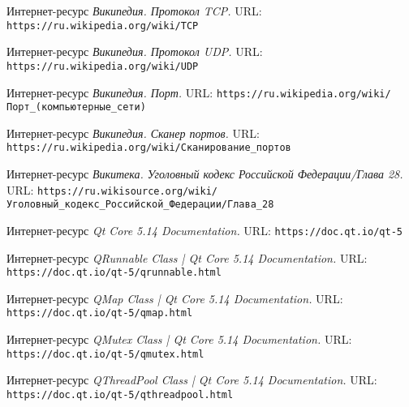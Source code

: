  
\clearpage

\begin{thebibliography}{3}
Интернет-ресурс \textit{Википедия. Протокол TCP.} URL: \texttt{https://ru.wikipedia.org/wiki/TCP}

Интернет-ресурс \textit{Википедия. Протокол UDP.} URL: \texttt{https://ru.wikipedia.org/wiki/UDP}

Интернет-ресурс \textit{Википедия. Порт.} URL: \texttt{https://ru.wikipedia.org/wiki/Порт\_(компьютерные\_сети)}

Интернет-ресурс \textit{Википедия. Сканер портов.} URL: \texttt{https://ru.wikipedia.org/wiki/Сканирование\_портов}

Интернет-ресурс \textit{Викитека. Уголовный кодекс Российской Федерации/Глава 28.} URL: \texttt{https://ru.wikisource.org/wiki/Уголовный\_кодекс\_Российской\_Федерации/Глава\_28}

Интернет-ресурс \textit{Qt Core 5.14 Documentation.} URL: \texttt{https://doc.qt.io/qt-5}

Интернет-ресурс \textit{QRunnable Class | Qt Core 5.14 Documentation.} URL: \texttt{https://doc.qt.io/qt-5/qrunnable.html}

Интернет-ресурс \textit{QMap Class | Qt Core 5.14 Documentation.} URL: \texttt{https://doc.qt.io/qt-5/qmap.html}

Интернет-ресурс \textit{QMutex Class | Qt Core 5.14 Documentation.} URL: \texttt{https://doc.qt.io/qt-5/qmutex.html}

Интернет-ресурс \textit{QThreadPool Class | Qt Core 5.14 Documentation.} URL: \texttt{https://doc.qt.io/qt-5/qthreadpool.html}

\end{thebibliography}

 